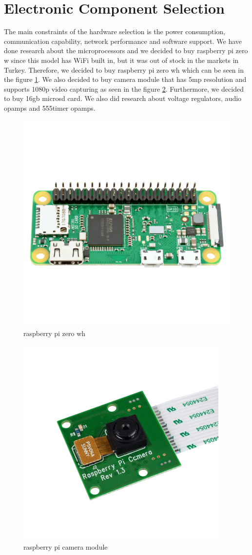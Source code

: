 \section{Electronic Component Selection} \label{sec:electronic}

The main constraints of the hardware selection is the power consumption, communication capability, network performance and software support. We have done research about the microprocessors and we decided to buy raspberry pi zero w since this model has WiFi built in, but it was out of stock in the markets in Turkey. Therefore, we decided to buy raspberry pi zero wh which can be seen in the figure \ref{fig:raspberry pi zero wh}. We also decided to buy camera module that has 5mp resolution and supports 1080p video capturing as seen in the figure \ref{fig:raspberry pi camera module}. Furthermore, we decided to buy 16gb microsd card. We also did research about voltage regulators, audio opamps and 555timer opamps.

\begin{figure}[h]
    \centering
    \includegraphics[width=.35\linewidth]{pizerowh.png}
    \caption{raspberry pi zero wh}
    \label{fig:raspberry pi zero wh}
\end{figure}

\begin{figure}[b]
    \centering
    \includegraphics[width=.35\linewidth]{picammodule.png}
    \caption{raspberry pi camera module}
    \label{fig:raspberry pi camera module}
\end{figure}





